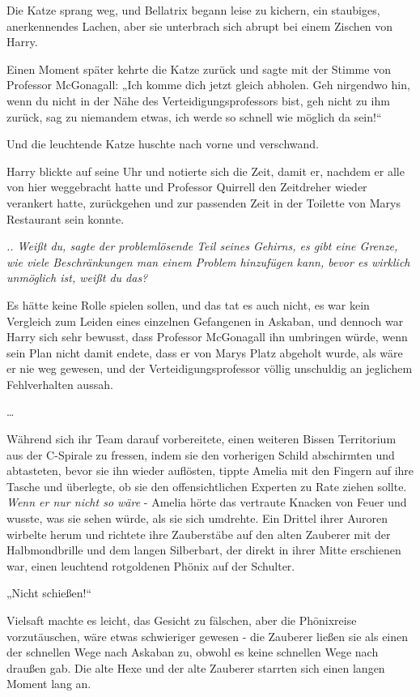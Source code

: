 {Die Katze sprang weg, und Bellatrix begann leise zu kichern, ein staubiges, anerkennendes Lachen, aber sie unterbrach sich abrupt bei einem Zischen von Harry.

Einen Moment später kehrte die Katze zurück und sagte mit der Stimme von Professor McGonagall: „Ich komme dich jetzt gleich abholen. Geh nirgendwo hin, wenn du nicht in der Nähe des Verteidigungsprofessors bist, geh nicht zu ihm zurück, sag zu niemandem etwas, ich werde so schnell wie möglich da sein!“

Und die leuchtende Katze huschte nach vorne und verschwand.

Harry blickte auf seine Uhr und notierte sich die Zeit, damit er, nachdem er alle von hier weggebracht hatte und Professor Quirrell den Zeitdreher wieder verankert hatte, zurückgehen und zur passenden Zeit in der Toilette von Marys Restaurant sein konnte.

\emph{.. Weißt du, sagte der problemlösende Teil seines Gehirns, es gibt eine Grenze, wie viele Beschränkungen man einem Problem hinzufügen kann, bevor es wirklich unmöglich ist, weißt du das?}

Es hätte keine Rolle spielen sollen, und das tat es auch nicht, es war kein Vergleich zum Leiden eines einzelnen Gefangenen in Askaban, und dennoch war Harry sich sehr bewusst, dass Professor McGonagall ihn umbringen würde, wenn sein Plan nicht damit endete, dass er von Marys Platz abgeholt wurde, als wäre er nie weg gewesen, und der Verteidigungsprofessor völlig unschuldig an jeglichem Fehlverhalten aussah.

…

Während sich ihr Team darauf vorbereitete, einen weiteren Bissen Territorium aus der C-Spirale zu fressen, indem sie den vorherigen Schild abschirmten und abtasteten, bevor sie ihn wieder auflösten, tippte Amelia mit den Fingern auf ihre Tasche und überlegte, ob sie den offensichtlichen Experten zu Rate ziehen sollte. \emph{Wenn er nur nicht so wäre} - Amelia hörte das vertraute Knacken von Feuer und wusste, was sie sehen würde, als sie sich umdrehte. Ein Drittel ihrer Auroren wirbelte herum und richtete ihre Zauberstäbe auf den alten Zauberer mit der Halbmondbrille und dem langen Silberbart, der direkt in ihrer Mitte erschienen war, einen leuchtend rotgoldenen Phönix auf der Schulter.

„Nicht schießen!“

Vielsaft machte es leicht, das Gesicht zu fälschen, aber die Phönixreise vorzutäuschen, wäre etwas schwieriger gewesen - die Zauberer ließen sie als einen der schnellen Wege nach Askaban zu, obwohl es keine schnellen Wege nach draußen gab. Die alte Hexe und der alte Zauberer starrten sich einen langen Moment lang an.

}
